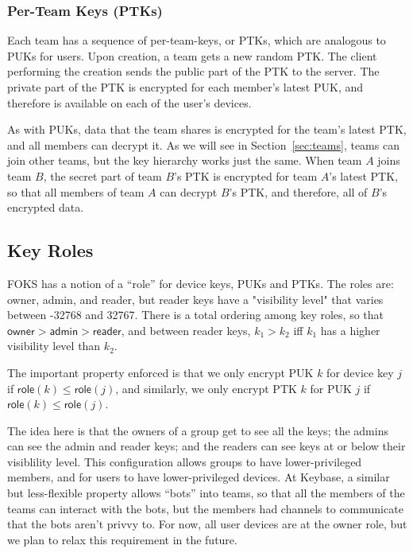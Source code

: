 \subsubsection{Per-Team Keys (PTKs)}

Each team has a sequence of per-team-keys, or PTKs, which are analogous
to PUKs for users. Upon creation, a team gets a new random PTK. The 
client performing the creation sends the public part of the PTK to the server.
The private part of the PTK is encrypted for each member's latest PUK,
and therefore is available on each of the user's devices.

As with PUKs, data that the team shares is encrypted for the team's latest PTK,
and all members can decrypt it. As we will see in Section~\ref{sec:teams}, teams can
join other teams, but the key hierarchy works just the same. When team $A$ joins
team $B$, the secret part of team $B$'s PTK is encrypted for team $A$'s latest PTK,
so that all members of team $A$ can decrypt $B$'s PTK, and therefore, all of
$B$'s encrypted data.

\subsection{Key Roles}

\newcommand{\owner}{\textsf{owner}}
\newcommand{\admin}{\textsf{admin}}
\newcommand{\reader}{\textsf{reader}}
\newcommand{\role}[1]{\textsf{role}(#1)}


FOKS has a notion of a ``role'' for device keys, PUKs and PTKs. The roles
are: \owner, \admin, and \reader, but \reader{} keys have a "visibility level"
that varies between -32768 and 32767. There is a total ordering among key roles,
so that $\owner > \admin > \reader$, and between reader keys, $k_1 > k_2$ iff
$k_1$ has a higher visibility level than $k_2$.

The important property enforced is that we only encrypt PUK $k$ for device key
$j$ if $\role{k} \le \role{j}$, and similarly, we only encrypt PTK $k$ for PUK
$j$ if $\role{k} \le \role{j}$.

The idea here is that the owners of a group get to see all the keys; the admins
can see the admin and reader keys; and the readers can see keys at or below
their visiblility level. This configuration allows groups to have
lower-privileged members, and for users to have lower-privileged devices. At
Keybase, a similar but less-flexible property allows ``bots'' into teams, so that
all the members of the teams can interact with the bots, but the members had
channels to communicate that the bots aren't privvy to.  For now, all user
devices are at the \owner{} role, but we plan to relax this requirement in the
future.

